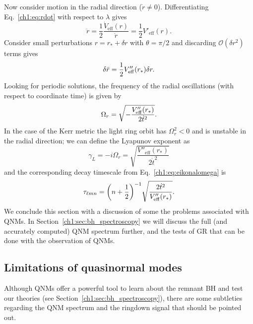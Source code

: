 Now consider motion in the radial direction ($\dot{r} \neq 0$).
Differentiating Eq.~\ref{ch1:eq:rdot} with respect to $\lambda$ gives
\begin{equation}
    \ddot{r} = \frac{1}{2} \frac{\dot{V}_\mathrm{eff}(r)}{\dot{r}} = \frac{1}{2}V'_\mathrm{eff}(r).
\end{equation}
Consider small perturbations $r = r_* + \delta r$ with $\theta = \pi/2$ and discarding $\mathcal{O}(\delta r^2)$ terms gives
\begin{equation}
    \delta \ddot{r} = \frac{1}{2}V''_{\rm eff}(r_*)\delta r.
\end{equation}
Looking for periodic solutions, the frequency of the radial oscillations (with respect to coordinate time) is given by
\begin{equation}
    \Omega_{r} = \sqrt{-\frac{V''_{\rm eff}(r_*)}{2\dot{t}^2}}.
\end{equation}
In the case of the Kerr metric the light ring orbit has $\Omega_r^2 < 0$ and is unstable in the radial direction; we can define the Lyapunov exponent as
\begin{equation}
    \gamma_L = -i\Omega_r = \sqrt{\frac{V''_\mathrm{eff}(r_*)}{2\dot{t}^2}}
\end{equation}
and the corresponding decay timescale from Eq.~\ref{ch1:eq:eikonalomega} is
\begin{equation}
    \tau_{\ell m n} = \qty(n + \frac{1}{2})^{-1} \sqrt{\frac{2\dot{t}^2}{V''_\mathrm{eff}(r_*)}}.
\end{equation}
We conclude this section with a discussion of some the problems associated with QNMs.
In Section~\ref{ch1:sec:bh_spectroscopy} we will discuss the full (and accurately computed) QNM spectrum further, and the tests of GR that can be done with the observation of QNMs.

\subsection{Limitations of quasinormal modes}
\label{ch1:sec:limitations}

Although QNMs offer a powerful tool to learn about the remnant BH and test our theories (see Section~\ref{ch1:sec:bh_spectroscopy}), there are some subtleties regarding the QNM spectrum and the ringdown signal that should be pointed out. 


